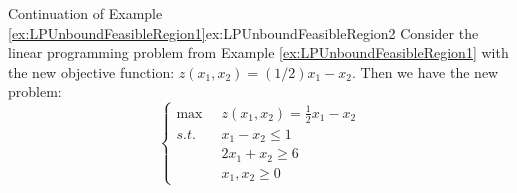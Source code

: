 \begin{example}{Continuation of Example \ref{ex:LPUnboundFeasibleRegion1}}{ex:LPUnboundFeasibleRegion2}
Consider the linear programming problem from Example \ref{ex:LPUnboundFeasibleRegion1} with the new objective function: $z(x_1,x_2) = (1/2)x_1 - x_2$. Then we have the new problem:
\begin{equation}
\left\{
\begin{aligned}
\max\;\;& z(x_1,x_2) =\frac{1}{2}x_1 - x_2\\
s.t.\;\;& x_1 - x_2 \leq 1\\
& 2x_1 + x_2 \geq 6\\
&x_1,x_2 \geq 0
\end{aligned}
\right.
\label{eqn:LPUnboundFeasibleRegion2}
\end{equation}
\end{example}
